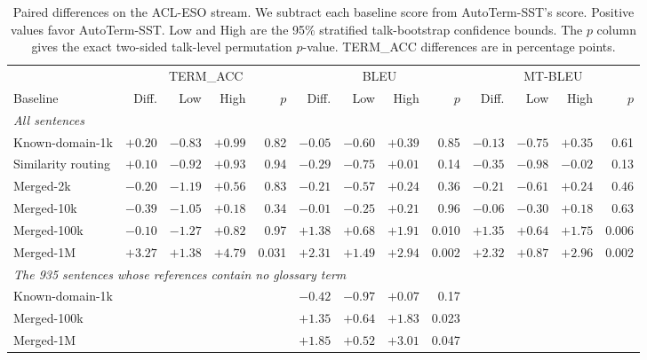 \appendix

\begin{table}[t]
\centering
\footnotesize
\setlength{\tabcolsep}{3pt}
\begin{tabular}{lrrrrrrrrrrrr}
\toprule
& \multicolumn{4}{c}{TERM\_ACC} & \multicolumn{4}{c}{BLEU} & \multicolumn{4}{c}{MT-BLEU} \\
\cmidrule(lr){2-5}\cmidrule(lr){6-9}\cmidrule(lr){10-13}
Baseline & Diff. & Low & High & $p$ & Diff. & Low & High & $p$ & Diff. & Low & High & $p$ \\
\midrule
\multicolumn{13}{l}{\emph{All sentences}} \\
Known-domain-1k & $+0.20$ & $-0.83$ & $+0.99$ & 0.82 & $-0.05$ & $-0.60$ & $+0.39$ & 0.85 & $-0.13$ & $-0.75$ & $+0.35$ & 0.61 \\
Similarity routing & $+0.10$ & $-0.92$ & $+0.93$ & 0.94 & $-0.29$ & $-0.75$ & $+0.01$ & 0.14 & $-0.35$ & $-0.98$ & $-0.02$ & 0.13 \\
Merged-2k & $-0.20$ & $-1.19$ & $+0.56$ & 0.83 & $-0.21$ & $-0.57$ & $+0.24$ & 0.36 & $-0.21$ & $-0.61$ & $+0.24$ & 0.46 \\
Merged-10k & $-0.39$ & $-1.05$ & $+0.18$ & 0.34 & $-0.01$ & $-0.25$ & $+0.21$ & 0.96 & $-0.06$ & $-0.30$ & $+0.18$ & 0.63 \\
Merged-100k & $-0.10$ & $-1.27$ & $+0.82$ & 0.97 & $+1.38$ & $+0.68$ & $+1.91$ & 0.010 & $+1.35$ & $+0.64$ & $+1.75$ & 0.006 \\
Merged-1M & $+3.27$ & $+1.38$ & $+4.79$ & 0.031 & $+2.31$ & $+1.49$ & $+2.94$ & 0.002 & $+2.32$ & $+0.87$ & $+2.96$ & 0.002 \\
\midrule
\multicolumn{13}{l}{\emph{The 935 sentences whose references contain no glossary term}} \\
Known-domain-1k &  & & &  & $-0.42$ & $-0.97$ & $+0.07$ & 0.17 &  & & &  \\
Merged-100k &  & & &  & $+1.35$ & $+0.64$ & $+1.83$ & 0.023 &  & & &  \\
Merged-1M &  & & &  & $+1.85$ & $+0.52$ & $+3.01$ & 0.047 &  & & &  \\
\bottomrule
\end{tabular}
\caption{Paired differences on the ACL-ESO stream. We subtract each baseline score
from AutoTerm-SST's score. Positive values favor AutoTerm-SST. Low and High are the
95\% stratified talk-bootstrap confidence bounds. The $p$ column gives the exact
two-sided talk-level permutation $p$-value.
TERM\_ACC differences are in percentage points.}
\label{tab:stats}
\end{table}

